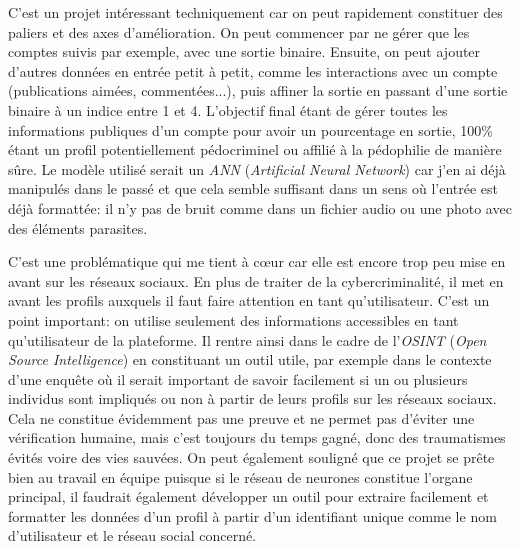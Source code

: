 \documentclass[a4paper, 11pt]{article}
\begin{document}
        C'est un projet intéressant techniquement car on peut rapidement constituer des paliers et des axes d'amélioration. On peut commencer par ne gérer que les comptes suivis par exemple, avec une sortie binaire. Ensuite, on peut ajouter d'autres données en entrée petit à petit, comme les interactions avec un compte (publications aimées, commentées...), puis affiner la sortie en passant d'une sortie binaire à un indice entre 1 et 4. L'objectif final étant de gérer toutes les informations publiques d'un compte pour avoir un pourcentage en sortie, 100\% étant un profil potentiellement pédocriminel ou affilié à la pédophilie de manière sûre. Le modèle utilisé serait un \emph{ANN} (\emph{Artificial Neural Network}) car j'en ai déjà manipulés dans le passé et que cela semble suffisant dans un sens où l'entrée est déjà formattée: il n'y pas de bruit comme dans un fichier audio ou une photo avec des éléments parasites.

        C'est une problématique qui me tient à cœur car elle est encore trop peu mise en avant sur les réseaux sociaux. En plus de traiter de la cybercriminalité, il met en avant les profils auxquels il faut faire attention en tant qu'utilisateur. C'est un point important: on utilise seulement des informations accessibles en tant qu'utilisateur de la plateforme. Il rentre ainsi dans le cadre de l'\emph{OSINT} (\emph{Open Source Intelligence}) en constituant un outil utile, par exemple dans le contexte d'une enquête où il serait important de savoir facilement si un ou plusieurs individus sont impliqués ou non à partir de leurs profils sur les réseaux sociaux. Cela ne constitue évidemment pas une preuve et ne permet pas d'éviter une vérification humaine, mais c'est toujours du temps gagné, donc des traumatismes évités voire des vies sauvées. On peut également souligné que ce projet se prête bien au travail en équipe puisque si le réseau de neurones constitue l'organe principal, il faudrait également développer un outil pour extraire facilement et formatter les données d'un profil à partir d'un identifiant unique comme le nom d'utilisateur et le réseau social concerné.
\end{document}
